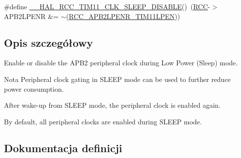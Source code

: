 \begin{DoxyCompactItemize}
\item 
\#define \hyperlink{group___r_c_c___a_p_b2___low_power___enable___disable_gaf9c48fd8cd99db0e44d5427afe10c383}{\+\_\+\+\_\+\+H\+A\+L\+\_\+\+R\+C\+C\+\_\+\+T\+I\+M11\+\_\+\+C\+L\+K\+\_\+\+S\+L\+E\+E\+P\+\_\+\+D\+I\+S\+A\+B\+LE}()~(\hyperlink{group___peripheral__declaration_ga74944438a086975793d26ae48d5882d4}{R\+CC}-\/$>$A\+P\+B2\+L\+P\+E\+NR \&= $\sim$(\hyperlink{group___peripheral___registers___bits___definition_gad43fcaa4f4d6fb2b590a6ffee31f8c94}{R\+C\+C\+\_\+\+A\+P\+B2\+L\+P\+E\+N\+R\+\_\+\+T\+I\+M11\+L\+P\+EN}))
\end{DoxyCompactItemize}


\subsection{Opis szczegółowy}
Enable or disable the A\+P\+B2 peripheral clock during Low Power (Sleep) mode. 

\begin{DoxyNote}{Nota}
Peripheral clock gating in S\+L\+E\+EP mode can be used to further reduce power consumption. 

After wake-\/up from S\+L\+E\+EP mode, the peripheral clock is enabled again. 

By default, all peripheral clocks are enabled during S\+L\+E\+EP mode. 
\end{DoxyNote}


\subsection{Dokumentacja definicji}
\mbox{\label{group___r_c_c___a_p_b2___low_power___enable___disable_ga9534ddc24145ef6335d76b35632b7fe2}} 
